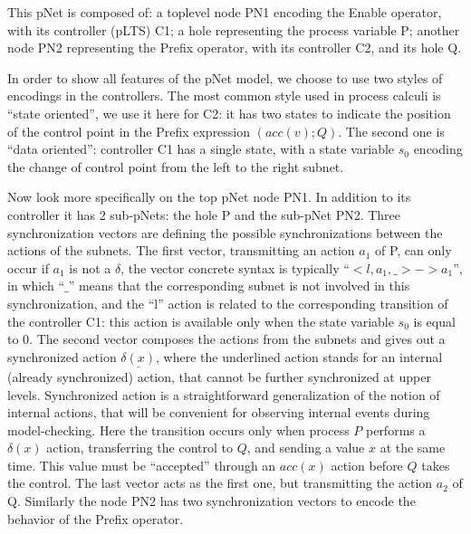 \documentclass{lncs/llncs}
\begin{document}
  This pNet is composed of: a toplevel node PN1 encoding the Enable
  operator, with its controller (pLTS) C1; a hole representing the
  process variable P; another node PN2 representing the Prefix
  operator, with its controller C2, and its hole Q. 

In order to show all features of the pNet model, we choose to use two
styles of encodings in the controllers.
The most common style used in process calculi is ``state oriented'',
we use it here for C2: it has two states to
indicate the position of the control point in the
Prefix expression $(acc(v);Q)$. The second one is
``data oriented'': controller C1 has a single state, with a state
variable $s_0$ encoding the change of control point from the left to
the right subnet.

Now look more specifically on the top pNet node PN1. In addition to
its controller it has 2 sub-pNets: the hole P and the sub-pNet PN2.
Three synchronization vectors are defining the possible
synchronizations between the actions of the subnets.
 The first
vector, transmitting an action $a_1$ of P, can only occur if $a_1$ is not
a $\delta$, the vector concrete syntax is typically ``$< l, a_1 , \_ >
-> a_1$'', in which ``$\_$'' means that the corresponding subnet is
not involved in this synchronization, and the ``l'' action is related
to the corresponding transition of the controller C1: this action is
available only when the state variable $s_0$ is equal to 0.
The second vector composes the
actions from the subnets and gives out a synchronized action
$\underline{\delta(x)}$, where the underlined action stands for an
internal (already synchronized) action, that cannot be further
synchronized at upper levels. Synchronized action is a straightforward
generalization of the notion of internal actions, that will be
convenient for observing internal events during model-checking. Here
the transition occurs only when process
$P$ performs a $\delta(x)$ action, transferring the control to $Q$,
and sending a value $x$ at the same time. This value must be
``accepted''  through an $acc(x)$ action before $Q$ takes the
control. The last vector acts as the first one, but transmitting the
action $a_2$ of Q.  
Similarly the node PN2 has two synchronization vectors to encode
the behavior of the Prefix operator. 
\end{document}
